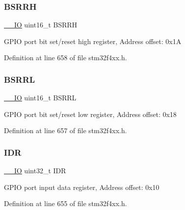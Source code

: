 \subsubsection{\texorpdfstring{B\+S\+R\+RH}{BSRRH}}
{\footnotesize\ttfamily \hyperlink{group___c_m_s_i_s__core__definitions_gaec43007d9998a0a0e01faede4133d6be}{\+\_\+\+\_\+\+IO} uint16\+\_\+t B\+S\+R\+RH}

G\+P\+IO port bit set/reset high register, Address offset\+: 0x1A 

Definition at line 658 of file stm32f4xx.\+h.

\mbox{\label{struct_g_p_i_o___type_def_aa79204c9bcc8c481da0a5ffe7c74d8b0}} 
\subsubsection{\texorpdfstring{B\+S\+R\+RL}{BSRRL}}
{\footnotesize\ttfamily \hyperlink{group___c_m_s_i_s__core__definitions_gaec43007d9998a0a0e01faede4133d6be}{\+\_\+\+\_\+\+IO} uint16\+\_\+t B\+S\+R\+RL}

G\+P\+IO port bit set/reset low register, Address offset\+: 0x18 

Definition at line 657 of file stm32f4xx.\+h.

\mbox{\label{struct_g_p_i_o___type_def_a328d2fe9ef1d513c3a97d30f98f0047c}} 
\subsubsection{\texorpdfstring{I\+DR}{IDR}}
{\footnotesize\ttfamily \hyperlink{group___c_m_s_i_s__core__definitions_gaec43007d9998a0a0e01faede4133d6be}{\+\_\+\+\_\+\+IO} uint32\+\_\+t I\+DR}

G\+P\+IO port input data register, Address offset\+: 0x10 

Definition at line 655 of file stm32f4xx.\+h.

\mbox{\label{struct_g_p_i_o___type_def_a2612a0f4b3fbdbb6293f6dc70105e190}} 
